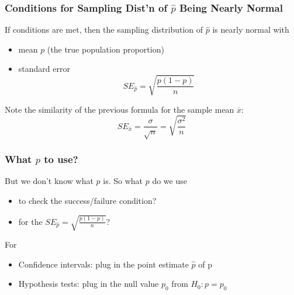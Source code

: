 \documentclass[handout]{beamer}
\newcommand{\blue}[1]{\textcolor{blue2}{#1}}
\newcommand{\xbar}{\overline{x}}
\newcommand{\phat}{\widehat{p}}
\begin{document}
\begin{frame}[fragile]
\frametitle{Conditions for Sampling Dist'n of $\phat$ Being Nearly Normal}

%
%
If conditions are met, then the sampling distribution of $\phat$ is nearly normal with
\begin{itemize}
\item mean $p$ (the true population proportion)
\item standard error
\[
SE_{\phat} = \sqrt{\frac{p(1-p)}{n}}
\]
\end{itemize}

\pause Note the similarity of the previous formula for the sample mean $\xbar$: 
\[
SE_{\xbar} = \frac{\sigma}{\sqrt{n}} = \sqrt{\frac{\sigma^2}{n}}
\]

\end{frame}


\begin{frame}[fragile]
\frametitle{What $p$ to use?}

%
%
But we \blue{don't know} what $p$ is.  So what $p$ do we use
\begin{itemize}
\item to check the success/failure condition?
\item for the $SE_{\phat} = \sqrt{\frac{p(1-p)}{n}}$?
\end{itemize}

\vspace{0.5cm}
For
\begin{itemize}
\pause \item Confidence intervals: plug in the \blue{point estimate} $\phat$ of p
\pause \item Hypothesis tests: plug in the \blue{null value} $p_0$ from $H_0: p=p_0$
\end{itemize}

\end{frame}
\end{document}
